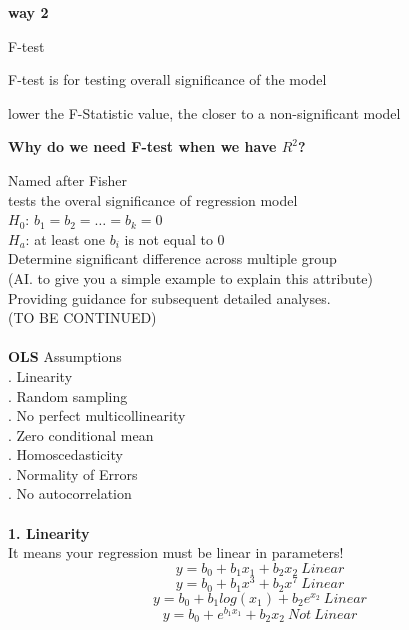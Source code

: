 \documentclass{article}
\begin{document}
\textbf{way 2}\\
\begin{list}{}{%
    \setlength{\leftmargin}{1em}}
    \item F-test\\
    \item F-test is for testing overall significance of the model\\
    \item lower the F-Statistic value, the closer to a non-significant model\\
    \item \textbf{Why do we need F-test when we have $R^2$?}\\
\end{list}
\indent \indent Named after Fisher\\
\indent \indent tests the overal significance of regression model\\
\indent \indent \indent $H_0$: $b_1=b_2=\dots=b_k=0$\\
\indent \indent \indent $H_a$: at least one $b_i$ is not equal to 0\\
\indent \indent Determine significant difference across multiple group\\
\indent \indent \indent (AI. to give you a simple example to explain this attribute)\\
\indent \indent Providing guidance for subsequent detailed analyses.\\
\indent \indent \indent (TO BE CONTINUED)\\
\\
\textbf{OLS} Assumptions\\
. Linearity\\
. Random sampling\\
. No perfect multicollinearity\\
. Zero conditional mean\\
. Homoscedasticity\\
. Normality of Errors\\
. No autocorrelation\\
\\
\indent \textbf{1. Linearity}\\
\indent \indent It means your regression must be linear in parameters!\\
\[ y=b_0+b_1x_1+b_2x_2\ Linear \]
\[ y=b_0+b_1x^3+b_2x^7\ Linear \]
\[ y=b_0+b_1log(x_1)+b_2e^{x_2}\ Linear \]
\[ y=b_0+e^{b_1x_1}+b_2x_2\ Not\ Linear\] 
\end{document}
